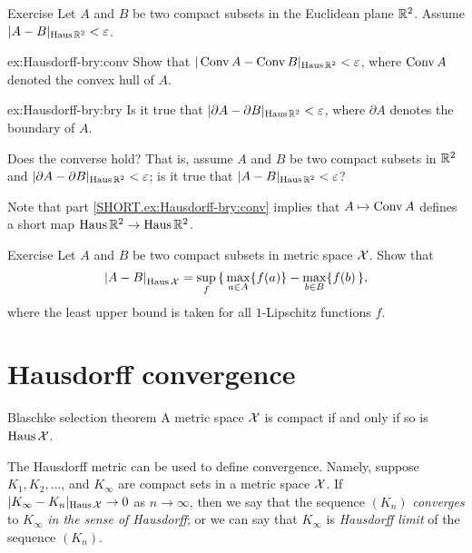 \begin{thm}{Exercise}\label{ex:Hausdorff-bry}
Let $A$ and $B$ be two compact subsets in the Euclidean plane $\mathbb{R}^2$.
Assume $|A-B|_{\operatorname{\rm Haus}\nolimits\mathbb{R}^2}<\varepsilon$.

\begin{subthm}{ex:Hausdorff-bry:conv}
Show that $|\mathop{\rm Conv}\nolimits A-\mathop{\rm Conv}\nolimits B|_{\operatorname{\rm Haus}\nolimits\mathbb{R}^2}<\varepsilon$, where $\mathop{\rm Conv}\nolimits A$ denoted the convex hull of $A$.
\end{subthm}
\begin{subthm}{ex:Hausdorff-bry:bry}
Is it true that
$|\partial A-\partial B|_{\operatorname{\rm Haus}\nolimits\mathbb{R}^2}<\varepsilon$,
where $\partial A$ denotes the boundary of $A$.

Does the converse hold? That is, assume $A$ and $B$ be two compact subsets in $\mathbb{R}^2$
and $|\partial A-\partial B|_{\operatorname{\rm Haus}\nolimits\mathbb{R}^2}<\varepsilon$; 
is it true that $|A-B|_{\Haus\RR^2}\z<\eps$?
\end{subthm}

\end{thm}

Note that part \ref{SHORT.ex:Hausdorff-bry:conv} implies that $A\mapsto \mathop{\rm Conv}\nolimits A$ defines a short map $\operatorname{\rm Haus}\nolimits\mathbb{R}^2\to \operatorname{\rm Haus}\nolimits\mathbb{R}^2$. 

\begin{thm}{Exercise}\label{ex:Haus-func}
Let $A$ and $B$ be two compact subsets in metric space $\mathcal{X}$.
Show that 
\[\dist{A}{B}{\Haus\spc{X}}=\sup_f\, \{\,\max_{a\in A}\{f(a)\}-\max_{b\in B}\{f(b)\,\},\]
where the least upper bound is taken for all $1$-Lipschitz functions $f$.

\end{thm}


\section{Hausdorff convergence}

\begin{thm}{Blaschke selection theorem}\label{thm:compact+Hausdorff}
A metric space $\mathcal{X}$ is compact if and only if
so is $\operatorname{\rm Haus}\nolimits\mathcal{X}$.
\end{thm}

The Hausdorff metric can be used to define convergence.
Namely, suppose $K_1,K_2,\dots$, and $K_\infty$ are compact sets in a metric space $\mathcal{X}$.
If $|K_\infty-K_n|_{\operatorname{\rm Haus}\nolimits\mathcal{X}}\to0$ as $n\to\infty$, then we say that 
the sequence $(K_n)$ {}\emph{converges} to $K_\infty$ \emph{in the sense of Hausdorff};
or we can say that $K_\infty$ is \emph{Hausdorff limit} of the sequence $(K_n)$.

